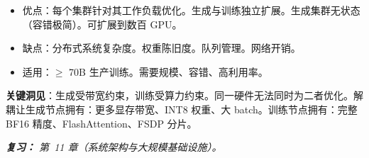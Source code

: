 \begin{questionbox}
\begin{itemize}
  \item 优点：每个集群针对其工作负载优化。生成与训练独立扩展。生成集群无状态（容错极简）。可扩展到数百 GPU。
  \item 缺点：分布式系统复杂度。权重陈旧度。队列管理。网络开销。
  \item 适用：$\geq$ 70B 生产训练。需要规模、容错、高利用率。
\end{itemize}

\textbf{关键洞见}：生成受带宽约束，训练受算力约束。同一硬件无法同时为二者优化。解耦让生成节点拥有：更多显存带宽、INT8 权重、大 batch。训练节点拥有：完整 BF16 精度、FlashAttention、FSDP 分片。

\emph{\textbf{复习：} 第~11 章（系统架构与大规模基础设施）。}
\end{questionbox}

